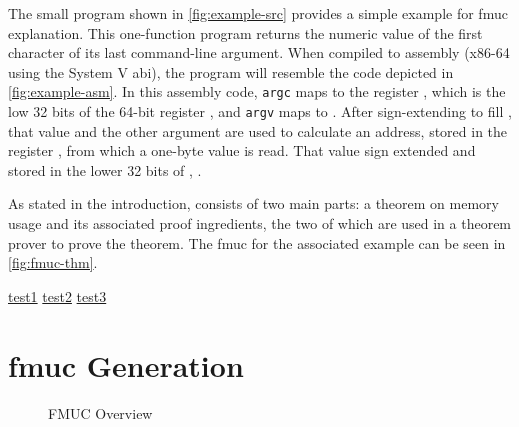The small program shown in \cref{fig:example-src} provides a simple example
for \ac{fmuc} explanation. This one-function program
returns the numeric value of the first character of its last command-line argument.
When compiled to assembly (x86-64 using the System V \ac{abi}),
the program will resemble the code depicted in \cref{fig:example-asm}.
In this assembly code,
\lstinline|argc| maps to the register ,
which is the low 32 bits of the 64-bit register ,
and \lstinline|argv| maps to .
After sign-extending  to fill ,
that value and the other argument are used to calculate
an address, stored in the register ,
from which a one-byte value is read.
That value sign extended and stored in the lower 32 bits of ,
.

As stated in the introduction,  consists of two main parts:
a theorem on memory usage and its associated proof ingredients,
the two of which are used in a theorem prover to prove the theorem.
The \ac{fmuc} for the associated example can be seen in \cref{fig:fmuc-thm}.


\hyperlink{m:a}{test1} %
\hyperlink{m:b}{test2}
\hyperlink{m:c}{test3}

\section{\acs*{fmuc} Generation}\label{se:fmuc_gen}
\begin{figure*}
  \centering
  \caption{FMUC Overview}\label{fig:overview}
\end{figure*}

